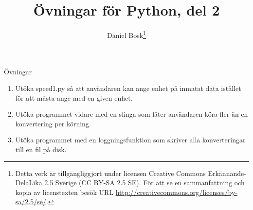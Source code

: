 \documentclass[handout]{beamer}
\title{%
  Övningar för Python, del 2
}
\author{Daniel Bosk\footnote{%
  Detta verk är tillgängliggjort under licensen Creative Commons 
  Erkännande-DelaLika 2.5 Sverige (CC BY-SA 2.5 SE).
	För att se en sammanfattning och kopia av licenstexten besök URL 
	\url{http://creativecommons.org/licenses/by-sa/2.5/se/}.
}}
\institute{%
  Avdelningen för informations- och kommunikationssytem (IKS),\\
  Mittuniversitetet, Sundsvall.
}
\date{\svnId}
\begin{document}
\begin{frame}
  \titlepage
\end{frame}

%  

\begin{frame}{Övningar}
  \begin{enumerate}
    \item Utöka speed1.py så att användaren kan ange enhet på inmatat data 
      istället för att måsta ange med en given enhet.

    \item Utöka programmet vidare med en slinga som låter användaren köra fler 
      än en konvertering per körning.

    \item Utöka programmet med en loggningsfunktion som skriver alla 
      konverteringar till en fil på disk.

  \end{enumerate}
\end{frame}



%  
\end{document}
